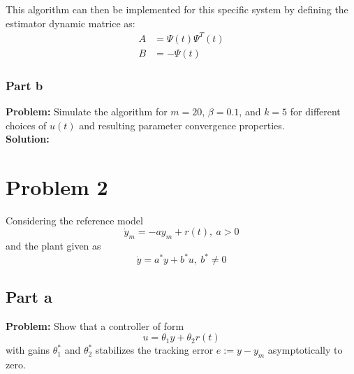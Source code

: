 \documentclass[letter]{article}
\begin{document}
This algorithm can then be implemented for this specific system by defining the estimator dynamic matrice as:
\begin{equation}
	\begin{aligned}
		A &= \Psi(t) \Psi^T(t)\\
		B &= - \Psi(t)
	\end{aligned}
\end{equation}

\newpage
\subsubsection{Part b}
\textbf{Problem:}
Simulate the algorithm for $m = 20$, $\beta = 0.1$, and $k = 5$ for different choices of $u(t)$ and resulting parameter convergence properties.\\

\noindent
\textbf{Solution:}







\newpage
\section{Problem 2}
Considering the reference model
\begin{equation}
	\dot{y}_m = -a y_m + r(t), \ a>0
\end{equation}
and the plant given as
\begin{equation}
	\dot{y} = a^*y + b^* u, \ b^* \neq 0
\end{equation}

\subsection{Part a}
\textbf{Problem:}
Show that a controller of form $$u = \theta_1 y + \theta_2 r(t)$$ with gains $\theta^*_1$ and $\theta^*_2$ stabilizes the tracking error $e:= y-y_m$ asymptotically to zero.\\
\end{document}
